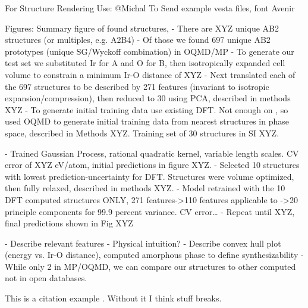 

For Structure Rendering Use:
@Michal To Send example vesta files, font Avenir


Figures: Summary figure of found structures,
- There are XYZ unique AB2 structures (or multiples, e.g. A2B4)
- Of those we found 697 unique AB2 prototypes (unique SG/Wyckoff combination) in OQMD/MP
- To generate our test set we substituted Ir for A and O for B, then isotropically expanded cell volume to constrain a minimum Ir-O distance of XYZ
- Next translated each of the 697 structures to be described by 271 features (invariant to isotropic expansion/compression), then reduced to 30 using PCA, described in methods XYZ
- To generate initial training data use existing DFT. Not enough on , so used OQMD to generate initial training data from nearest structures in phase space, described in Methods XYZ. Training set of 30 structures in SI XYZ.

- Trained Gaussian Process, rational quadratic kernel, variable length scales.
CV error of XYZ eV/atom, initial predictions in figure XYZ.
- Selected 10 structures with lowest prediction-uncertainty for DFT.
Structures were volume optimized, then fully relaxed, described in methods XYZ.
- Model retrained with the 10 DFT computed structures ONLY, 271 features->110 features applicable to ->20 principle components for 99.9 percent variance.
CV error…
- Repeat until XYZ, final predictions shown in Fig XYZ


- Describe relevant features
  - Physical intuition?
- Describe convex hull plot (energy vs. Ir-O distance), computed amorphous phase to define synthesizability
- While only 2  in MP/OQMD, we can compare our structures to other computed  not in open databases.

This is a citation example \cite{dummy9999}.
Without it I think stuff breaks.


